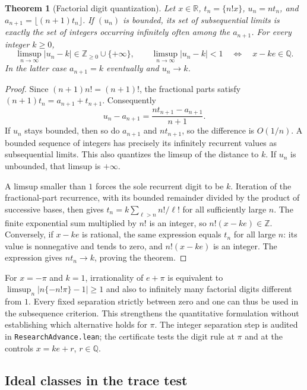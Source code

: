 \documentclass[11pt]{amsart}
\newtheorem{theorem}{Theorem}[section]
\theoremstyle{definition}
\theoremstyle{remark}
\numberwithin{equation}{section}
\newcommand{\Q}{\mathbb{Q}}
\newcommand{\R}{\mathbb{R}}
\newcommand{\Z}{\mathbb{Z}}
\begin{document}
\begin{theorem}[Factorial digit quantization]\label{thm:factorial-quantization}
Let $x\in\R$, $t_n=\{n!x\}$, $u_n=nt_n$, and
$a_{n+1}=\lfloor(n+1)t_n\rfloor$. If $(u_n)$ is bounded, its set of
subsequential limits is exactly the set of integers occurring
infinitely often among the $a_{n+1}$. For every integer $k\ge0$,
\[
 \limsup_{n\to\infty}|u_n-k|\in\Z_{\ge0}\cup\{+\infty\},
 \qquad
 \limsup_{n\to\infty}|u_n-k|<1
       \quad\Longleftrightarrow\quad x-ke\in\Q.
\]
In the latter case $a_{n+1}=k$ eventually and $u_n\to k$.
\end{theorem}
\begin{proof}
Since $(n+1)n!=(n+1)!$, the fractional parts satisfy
$(n+1)t_n=a_{n+1}+t_{n+1}$. Consequently
\[
 u_n-a_{n+1}=\frac{n t_{n+1}-a_{n+1}}{n+1}.
\]
If $u_n$ stays bounded, then so do $a_{n+1}$ and $nt_{n+1}$,
so the difference is $O(1/n)$. A bounded sequence of integers has
precisely its infinitely recurrent values as subsequential limits.
This also quantizes the limsup of the distance to $k$. If $u_n$ is
unbounded, that limsup is $+\infty$.

A limsup smaller than $1$ forces the sole recurrent digit to be $k$.
Iteration of the fractional-part recurrence, with its bounded
remainder divided by the product of successive bases, then gives
$t_n=k\sum_{\ell>n}n!/\ell!$ for all sufficiently large $n$.
The finite exponential sum multiplied by $n!$ is an integer, so
$n!(x-ke)\in\Z$. Conversely, if $x-ke$ is rational, the same
expression equals $t_n$ for all large $n$: its value is nonnegative
and tends to zero, and $n!(x-ke)$ is an integer. The expression gives
$nt_n\to k$, proving the theorem.
\end{proof}
For $x=-\pi$ and $k=1$, irrationality of $e+\pi$ is equivalent to
$\limsup_n|n\{-n!\pi\}-1|\ge1$ and also to infinitely many factorial
digits different from $1$. Every fixed separation strictly between
zero and one can thus be used in the subsequence criterion.
This strengthens the quantitative formulation without establishing
which alternative holds for $\pi$. The integer separation step is
audited in \texttt{ResearchAdvance.lean}; the certificate tests the
digit rule at $\pi$ and at the controls $x=ke+r$, $r\in\Q$.


\subsection{Ideal classes in the trace test}
\end{document}
